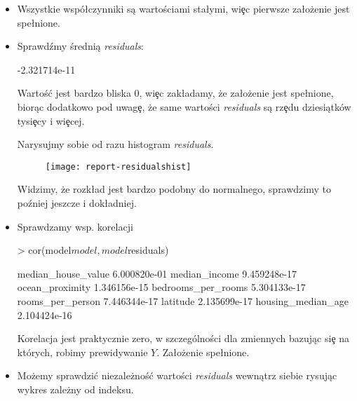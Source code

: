 \documentclass{article}
\begin{document}
\begin{itemize}
  \item Wszystkie wspó\l czynniki są wartościami sta\l ymi, wi\c ec pierwsze za\l ożenie jest spe\l nione.
  \item Sprawdźmy średnią \textit{residuals}:
\begin{Schunk}
\begin{Soutput}
[1] -2.321714e-11
\end{Soutput}
\end{Schunk}

  \noindent
  \quad Wartoś\'c jest bardzo bliska 0, wi\c ec zak\l adamy, że za\l ożenie jest spe\l nione, biorąc dodatkowo pod uwag\c e, że same wartości \textit{residuals} są rz\c edu dziesiątków tysi\c ecy i wi\c ecej.
  
  \noindent
  \quad Narysujmy sobie od razu histogram \textit{residuals}.
  
  \newpage
  
  \begin{figure}[h!]
  \centering
  \texttt{[image: report-residualshist]}
  \end{figure}
  
  \noindent
  \quad Widzimy, że rozk\l ad jest bardzo podobny do normalnego, sprawdzimy to poźniej jeszcze i dok\l adniej.
  
  \item Sprawdzamy wsp. korelacji
  
\begin{Schunk}
\begin{Sinput}
> cor(model$model, model$residuals)
\end{Sinput}
\begin{Soutput}
                           [,1]
median_house_value 6.000820e-01
median_income      9.459248e-17
ocean_proximity    1.346156e-15
bedrooms_per_rooms 5.304133e-17
rooms_per_person   7.446344e-17
latitude           2.135699e-17
housing_median_age 2.104424e-16
\end{Soutput}
\end{Schunk}

  \noindent
  \quad Korelacja jest praktycznie zero, w szczególności dla zmiennych bazując si\c e na których, robimy prewidywanie $Y$. Za\l ożenie spe\l nione.
  
  \item Możemy sprawdzi\'c niezależnoś\'c wartości \textit{residuals} wewnątrz siebie rysując wykres zależny od indeksu.
  

\end{itemize}
\end{document}
